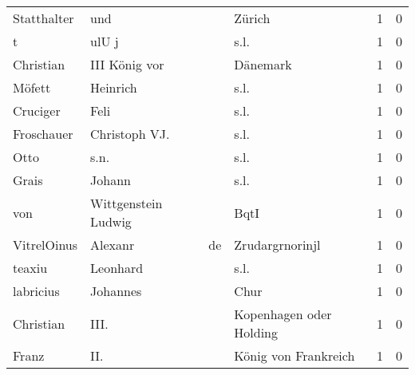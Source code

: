 \begin{tabular}{llllrr}
              Statthalter &                                und &             &                                      Zürich &          1 &         0 \\
                        t &                              ulU j &             &                                        s.l. &          1 &         0 \\
                Christian &                      III König vor &             &                                    Dänemark &          1 &         0 \\
                   Möfett &                           Heinrich &             &                                        s.l. &          1 &         0 \\
                 Cruciger &                               Feli &             &                                        s.l. &          1 &         0 \\
               Froschauer &                      Christoph VJ. &             &                                        s.l. &          1 &         0 \\
                     Otto &                               s.n. &             &                                        s.l. &          1 &         0 \\
                    Grais &                             Johann &             &                                        s.l. &          1 &         0 \\
                      von &                Wittgenstein Ludwig &             &                                        BqtI &          1 &         0 \\
              VitrelOinus &                            Alexanr &          de &                             Zrudargrnorinjl &          1 &         0 \\
                   teaxiu &                           Leonhard &             &                                        s.l. &          1 &         0 \\
                labricius &                           Johannes &             &                                        Chur &          1 &         0 \\
                Christian &                               III. &             &                     Kopenhagen oder Holding &          1 &         0 \\
                    Franz &                                II. &             &                        König von Frankreich &          1 &         0 \\

\end{tabular}
